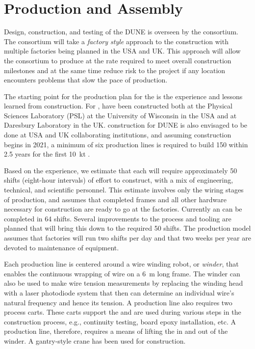 \section{Production and Assembly}
\label{sec:fdsp-apa-prod-assy}

Design, construction, and testing of the DUNE   is overseen by the  consortium. %
The  consortium will take a \textit{factory style} approach to the construction with multiple factories being planned in the USA and UK. This approach will allow the consortium to produce  at the rate required to meet overall construction milestones and at the same time reduce risk to the project if any location encounters problems that slow the pace of production.

The starting point for the  production plan for the  is the experience and lessons learned from  construction. For ,  have been constructed both at the Physical Sciences Laboratory (PSL) at the University of Wisconsin in the USA and at Daresbury Laboratory in the UK.   construction for DUNE is also envisaged to be done at USA and UK collaborating institutions, and assuming construction begins in 2021, a minimum of six production lines is required to build \num{150}  within \num{2.5} years for the first %
\SI{10}{kt} .   

Based on the  experience, we estimate that each  will require approximately \num{50} shifts (eight-hour intervals) of effort to construct, with a mix of engineering, technical, and scientific personnel. This estimate involves only the wiring stages of production, and assumes that completed frames and all other hardware necessary for construction are ready to go at the factories. Currently an  can be completed in \num{64} shifts. Several improvements to the process and tooling are planned that will bring this down to the required \num{50} shifts. The production model assumes that factories will run two shifts per day and that two weeks per year are devoted to maintenance of equipment. 

Each production line is centered around a wire winding robot, or \textit{winder}, that enables the continuous wrapping of wire on a \SI{6}{m} long frame. The winder can also be used to make wire tension measurements by replacing the winding head with a laser photodiode system that then can determine an individual wire's natural frequency and hence its tension. A production line also requires two process carts. These carts support the  and are used during various steps in the construction process, e.g., continuity testing, board epoxy installation, etc. A production line, therefore, requires a means of lifting the  in and out of the winder. A gantry-style crane has been used for  construction.

